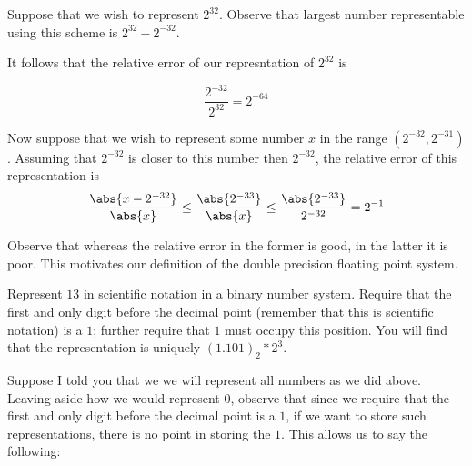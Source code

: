 \documentclass[../main.tex]{subfiles}
\begin{document}
\begin{remark}
    Suppose that we wish to represent $2^{32}$. Observe that largest number representable using this scheme is $2^{32} - 2^{-32}$.

    It follows that the relative error of our represntation of $2^{32}$ is 

    \[
        \frac{2^{-32}}{2^{32}} = 2^{-64}
    \]

    Now suppose that we wish to represent some number $x$ in the range $(2^{-32}, 2^{-31})$. Assuming that $2^{-32}$ is closer to this
    number then $2^{-32}$, the relative error of this representation is 
    \[
        \frac{\abs{x - 2^{-32}}}{\abs{x}} \leq \frac{\abs{2^{-33}}}{\abs{x}} \leq \frac{\abs{2^{-33}}}{2^{-32}} = 2^{-1}
    \]

    Observe that whereas the relative error in the former is good, in the latter it is poor. This motivates our definition of the
    double precision floating point system.
\end{remark}

\begin{example}
    Represent $13$ in scientific notation in a binary number system. Require that the first and only digit before the decimal point (remember that this is scientific notation) is a $1$; further require that $1$ must occupy this position.  You will find that the representation is uniquely $(1.101)_2 * 2^3$.
\end{example}

\begin{remark}
    Suppose I told you that we we will represent all numbers as we did above. Leaving aside how we would represent $0$, observe that since we require that the first and only digit before the decimal point is a $1$, if we want to store such representations, there is no point in storing the $1$. This allows us to say the following:
\end{remark}
\end{document}
